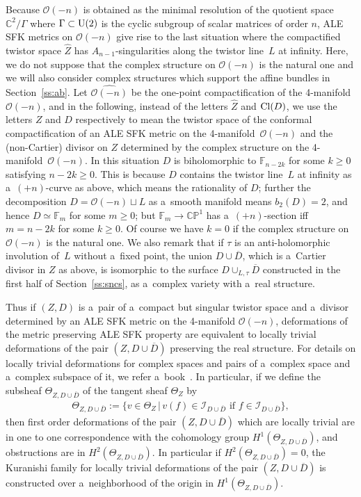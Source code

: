 Because $\mathscr O(-n)$ is obtained as the minimal resolution of the quotient space $\mathbb{C}^2/\Gamma$ where
$\Gamma\subset{\rm{U}}(2)$ is the cyclic subgroup of scalar matrices of order $n$, ALE SFK metrics on $\mathscr O(-n)$
give rise to the last situation where the compactif\/ied twistor space $\hat Z$ has $A_{n-1}$-singularities along the
twistor line~$L$ at inf\/inity.
Here, we do not suppose that the complex structure on $\mathscr O(-n)$ is the natural one and we will also consider
complex structures which support the af\/f\/ine bundles in Section~\ref{ss:ab}.
Let $\widehat{\mathscr O(-n)}$ be the one-point compactif\/ication of the 4-manifold $\mathscr O(-n)$, and in the
following, instead of the letters $\hat Z$ and ${\rm{Cl}}(D)$, we use the letters $Z$ and $D$ respectively to mean the
twistor space of the conformal compactif\/ication of an ALE SFK metric on the 4-mani\-fold~$\mathscr O(-n)$ and the
(non-Cartier) divisor on $Z$ determined by the complex structure on the 4-mani\-fold~$\mathscr O(-n)$.
In this situation $D$ is biholomorphic to $\mathbb{F}_{n-2k}$ for some $k\ge 0$ satisfying $n-2k\ge 0$.
This is because $D$ contains the twistor line~$L$ at inf\/inity as a~$(+n)$-curve as above, which means the rationality
of $D$; further the decomposition $D=\mathscr O(-n)\sqcup L$ as a~smooth manifold means $b_2(D) = 2$, and hence
$D\simeq\mathbb{F}_m$ for some $m\ge 0$; but $\mathbb{F}_m\to\mathbb{CP}^1$ has a~$(+n)$-section if\/f $m=n-2k$ for some $k\ge0$.
Of course we have $k=0$ if the complex structure on $\mathscr O(-n)$ is the natural one.
We also remark that if $\tau$ is an anti-holomorphic involution of~$L$ without a~f\/ixed point, the union
$D\cup\overline D$, which is a~Cartier divisor in $Z$ as above, is isomorphic to the surface $D\cup_{L,\tau}\overline D$
constructed in the f\/irst half of Section~\ref{ss:sncs}, as a~complex variety with a~real structure.

Thus if $(Z,D)$ is a~pair of a~compact but singular twistor space and a~divisor determined by an ALE SFK metric on the
4-manifold $\mathscr O(-n)$, deformations of the metric preserving ALE SFK property are equivalent to locally trivial
deformations of the pair $(Z,D\cup\overline D)$ preserving the real structure.
For details on locally trivial deformations for complex spaces and pairs of a~complex space and a~complex subspace of
it, we refer a~book~\cite[Section~3.4]{SeBook}.
In particular, if we def\/ine the subsheaf $\Theta_{Z, D\cup\overline D}$ of the tangent sheaf $\Theta_Z$ by
\begin{gather*}
\Theta_{Z, D\cup\overline D}:=\big\{v\in \Theta_Z\,|\, v(f) \in \mathscr I_{D\cup\overline D}
\text{ if }
f\in \mathscr I_{D\cup\overline D}\big\},
\end{gather*}
then f\/irst order deformations of the pair $(Z,D\cup\overline D)$ which are locally trivial are in one to one
correspondence with the cohomology group $H^1(\Theta_{Z,D\cup\overline D})$, and obstructions are in
$H^2(\Theta_{Z,D\cup\overline D})$.
In particular if $H^2(\Theta_{Z,D\cup\overline D})=0$, the Kuranishi family for locally trivial deformations of the pair
$(Z, D\cup\overline D)$ is constructed over a~neighborhood of the origin in $H^1(\Theta_{Z,D\cup\overline D})$.

